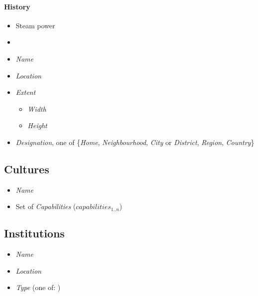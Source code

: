 \documentclass[]{article}
\begin{document}
\paragraph{History}\label{history}

\begin{itemize}
\item
  Steam power
\item
\end{itemize}


\begin{itemize}
\itemsep1pt\parskip0pt
\item
  \emph{Name}
\item
  \emph{Location}
\item
  \emph{Extent}

  \begin{itemize}
  \itemsep1pt\parskip0pt
  \item
    \emph{Width}
  \item
    \emph{Height}
  \end{itemize}
\item
  \emph{Designation}, one of \{\emph{Home}, \emph{Neighbourhood},
  \emph{City} or \emph{District}, \emph{Region}, \emph{Country}\}
\end{itemize}

\subsection{Cultures}\label{culture}

\begin{itemize}
\itemsep1pt\parskip0pt
\item
  \emph{Name}
\item
  Set of \emph{Capabilities} (\(capabilities_{1..n}\))
\end{itemize}

\subsection{Institutions}\label{institutions}

\begin{itemize}
\itemsep1pt\parskip0pt
\item
  \emph{Name}
\item
  \emph{Location}
\item
  \emph{Type} (one of: )
\end{itemize}
\end{document}
